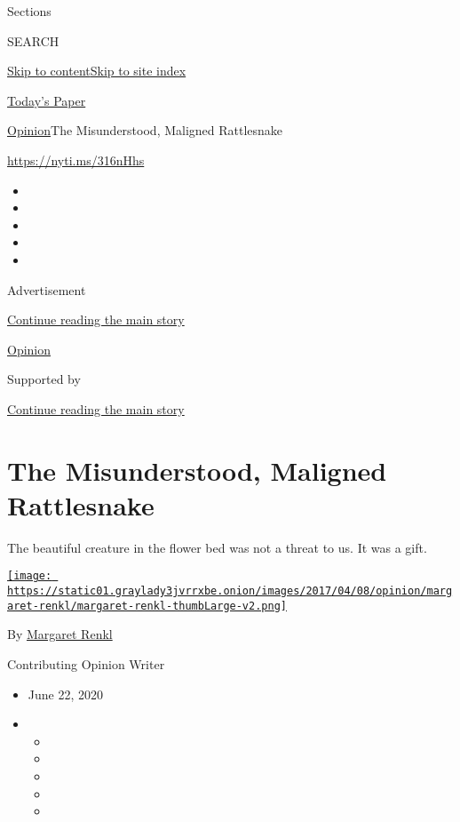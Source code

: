 Sections

SEARCH

\protect\hyperlink{site-content}{Skip to
content}\protect\hyperlink{site-index}{Skip to site index}

\href{https://myaccount.nytimes3xbfgragh.onion/auth/login?response_type=cookie\&client_id=vi}{}

\href{https://www.nytimes3xbfgragh.onion/section/todayspaper}{Today's
Paper}

\href{/section/opinion}{Opinion}\textbar{}The Misunderstood, Maligned
Rattlesnake

\url{https://nyti.ms/316nHhs}

\begin{itemize}
\item
\item
\item
\item
\item
\end{itemize}

Advertisement

\protect\hyperlink{after-top}{Continue reading the main story}

\href{/section/opinion}{Opinion}

Supported by

\protect\hyperlink{after-sponsor}{Continue reading the main story}

\hypertarget{the-misunderstood-maligned-rattlesnake}{%
\section{The Misunderstood, Maligned
Rattlesnake}\label{the-misunderstood-maligned-rattlesnake}}

The beautiful creature in the flower bed was not a threat to us. It was
a gift.

\href{https://www.nytimes3xbfgragh.onion/by/margaret-renkl}{\texttt{[image: https://static01.graylady3jvrrxbe.onion/images/2017/04/08/opinion/margaret-renkl/margaret-renkl-thumbLarge-v2.png]}}

By \href{https://www.nytimes3xbfgragh.onion/by/margaret-renkl}{Margaret
Renkl}

Contributing Opinion Writer

\begin{itemize}
\item
  June 22, 2020
\item
  \begin{itemize}
  \item
  \item
  \item
  \item
  \item
  \end{itemize}
\end{itemize}

